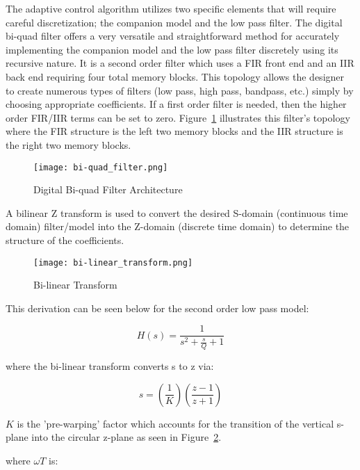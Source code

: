 The \Lone adaptive control algorithm utilizes two specific elements that will require careful discretization; the companion model and the low pass filter.  The digital bi-quad filter offers a very versatile and straightforward method for accurately implementing the companion model and the low pass filter discretely using its recursive nature.  It is a second order filter which uses a \ac{FIR} front end and an \ac{IIR} back end requiring four total memory blocks.  This topology allows the designer to create numerous types of filters (low pass, high pass, bandpass, etc.) simply by choosing appropriate coefficients.  If a first order filter is needed, then the higher order FIR/IIR terms can be set to zero.  Figure~\ref{fig:bi-quad} illustrates this filter's topology where the \ac{FIR} structure is the left two memory blocks and the \ac{IIR} structure is the right two memory blocks.

\begin{figure}[h!]
 \centering
  \texttt{[image: bi-quad\_filter.png]}
  \caption{Digital Bi-quad Filter Architecture }
  \label{fig:bi-quad}
\end{figure}

A bilinear Z transform is used to convert the desired S-domain (continuous time domain) filter/model into the Z-domain (discrete time domain) to determine the structure of the coefficients.

\begin{figure}[h!]
 \centering
  \texttt{[image: bi-linear\_transform.png]}
  \caption{Bi-linear Transform}
  \label{fig:bi-linear_transform}
\end{figure}

This derivation can be seen below for the second order low pass model:

\begin{equation}
 H(s) = \frac{1}{s^2+\frac{s}{Q}+1}
\end{equation}

where the bi-linear transform converts s to z via:

\begin{equation}
 s = \left(\frac{1}{K}\right)\left(\frac{z-1}{z+1}\right)
\end{equation}

$K$ is the 'pre-warping' factor which accounts for the transition of the vertical s-plane into the circular z-plane as seen in Figure~\ref{fig:bi-linear_transform}.

where $\omega T$ is:

